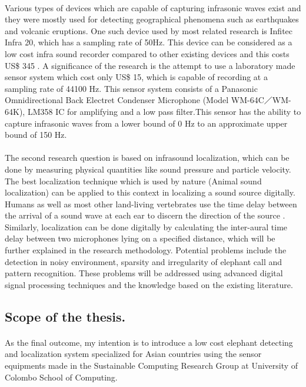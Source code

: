 \documentclass[11pt]{article}
\numberwithin{figure}{section}
\numberwithin{table}{section}
\begin{document}
\paragraph{}
Various types of devices which are capable of capturing infrasonic waves exist and they were mostly used for detecting geographical phenomena such as earthquakes and volcanic eruptions. One such device used by most related research is Infitec Infra 20, which has a sampling rate of 50Hz. This device can be considered as a low cost infra sound recorder compared to other existing devices and this costs US\$ 345 \cite {7}. A significance of the research is the attempt to use a laboratory made sensor system which cost only US\$ 15, which is capable of recording at a sampling rate of 44100 Hz. This sensor system consists of a Panasonic Omnidirectional Back Electret Condenser Microphone \cite{15} (Model WM-64C／WM-64K), LM358 IC for amplifying and a low pass filter\cite{16}.This sensor has the ability to capture infrasonic waves from a lower bound of 0 Hz to an approximate upper bound of 150 Hz.


\paragraph{}
The second research question is based on infrasound localization, which can be done by measuring physical quantities like sound pressure and particle velocity. The best localization technique which is used by nature (Animal sound localization) can be applied to this context in localizing a sound source digitally. Humans as well as most other land-living vertebrates use the time delay between the arrival of a sound wave at each ear to discern the direction of the source \cite {8}. Similarly, localization can be done digitally by calculating the inter-aural time delay  between two microphones lying on a specified distance, which will be further explained in the research methodology. Potential problems include the detection in noisy environment, sparsity and irregularity of elephant call and pattern recognition. These problems will be addressed using advanced digital signal processing techniques and the knowledge based on the existing literature.

\subsection{Scope of the thesis.}
\paragraph{}
As the final outcome, my intention is to introduce a low cost elephant detecting and localization system specialized for Asian countries using the sensor equipments made in the Sustainable Computing Research Group at University of Colombo School of Computing.
\end{document}
